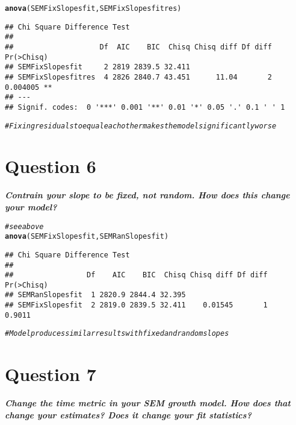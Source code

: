 \documentclass{article}\usepackage[]{graphicx}\usepackage[]{color}
\makeatletter
\newcommand{\hlcom}[1]{\textcolor[rgb]{0.678,0.584,0.686}{\textit{#1}}}%
\newcommand{\hlstd}[1]{\textcolor[rgb]{0.345,0.345,0.345}{#1}}%
\newcommand{\hlkwd}[1]{\textcolor[rgb]{0.737,0.353,0.396}{\textbf{#1}}}%
\newenvironment{kframe}{%
 \def\at@end@of@kframe{}%
 \ifinner\ifhmode%
  \def\at@end@of@kframe{\end{minipage}}%
  \begin{minipage}{\columnwidth}%
 \fi\fi%
 \def\FrameCommand##1{\hskip\@totalleftmargin \hskip-\fboxsep
 \colorbox{shadecolor}{##1}\hskip-\fboxsep
     \hskip-\linewidth \hskip-\@totalleftmargin \hskip\columnwidth}%
 \MakeFramed {\advance\hsize-\width
   \@totalleftmargin\z@ \linewidth\hsize
   \@setminipage}}%
 {\par\unskip\endMakeFramed%
 \at@end@of@kframe}
\newenvironment{knitrout}{}{} %
\makeatother
\begin{document}
\begin{knitrout}
\begin{kframe}
\begin{verbatim}
\end{verbatim}
\begin{alltt}
\hlkwd{anova}\hlstd{(SEMFixSlopesfit, SEMFixSlopesfitres)}
\end{alltt}
\begin{verbatim}
## Chi Square Difference Test
## 
##                    Df  AIC    BIC  Chisq Chisq diff Df diff Pr(>Chisq)   
## SEMFixSlopesfit     2 2819 2839.5 32.411                                 
## SEMFixSlopesfitres  4 2826 2840.7 43.451      11.04       2   0.004005 **
## ---
## Signif. codes:  0 '***' 0.001 '**' 0.01 '*' 0.05 '.' 0.1 ' ' 1
\end{verbatim}
\begin{alltt}
\hlcom{# Fixing residuals to equal each other makes the model significantly worse}
\end{alltt}
\end{kframe}
\end{knitrout}

\section{Question 6}
\textbf{\large{\textit{
Contrain your slope to be fixed, not random. How does this change your model?
}}}

\begin{knitrout}
\color{fgcolor}\begin{kframe}
\begin{alltt}
\hlcom{# see above}
\hlkwd{anova}\hlstd{(SEMFixSlopesfit, SEMRanSlopesfit)}
\end{alltt}
\begin{verbatim}
## Chi Square Difference Test
## 
##                 Df    AIC    BIC  Chisq Chisq diff Df diff Pr(>Chisq)
## SEMRanSlopesfit  1 2820.9 2844.4 32.395                              
## SEMFixSlopesfit  2 2819.0 2839.5 32.411    0.01545       1     0.9011
\end{verbatim}
\begin{alltt}
\hlcom{# Model produces similar results with fixed and random slopes}
\end{alltt}
\end{kframe}
\end{knitrout}

\section{Question 7}
\textbf{\large{\textit{
Change the time metric in your SEM growth model. How does that change your estimates? Does it change your fit statistics?
}}}
\end{document}
